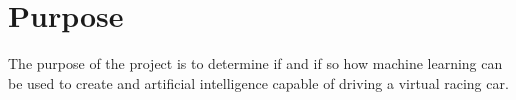 

\chapter{Purpose}
The purpose of the project is to determine if and if so how machine learning can be used to create and artificial intelligence capable of driving a virtual racing car. 



